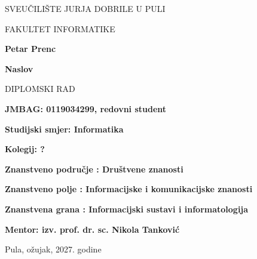 \begin{center}
SVEUČILIŠTE JURJA DOBRILE U PULI 

FAKULTET INFORMATIKE

\vspace{45mm} 

\textbf{Petar Prenc}

\vspace{20mm} 

\textbf{Naslov}

\vspace{5mm}
DIPLOMSKI RAD

\end{center}

\vspace{45mm}

\textbf{JMBAG: 0119034299, redovni student}

\textbf{Studijski smjer: Informatika}
\bigskip

\textbf{Kolegij: ?}

\textbf{Znanstveno područje : Društvene znanosti}

\textbf{Znanstveno polje : Informacijske i komunikacijske znanosti}

\textbf{Znanstvena grana : Informacijski sustavi i informatologija}
\bigskip

\textbf{Mentor: izv. prof. dr. sc. Nikola Tanković}

\vfill

\begin{center}

Pula, ožujak, 2027. godine

\end{center}